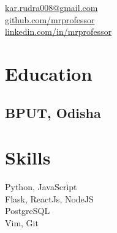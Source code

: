 \documentclass[]{hieudo-build}
\begin{document}
%
%
{
	\faEnvelope \href{mailto:kar.rudra008@gmail.com}{ kar.rudra008@gmail.com}\\
	\faGithub \href{https://github.com/mrprofessor}{   github.com/mrprofessor}\\
	\faLinkedinSquare \href{https://www.linkedin.com/in/mrprofessor}{   linkedin.com/in/mrprofessor}
}
    
%
%
\begin{minipage}[t]{0.34\textwidth} 

\section{Education} 

\subsection{BPUT, Odisha}
\sectionsep


\section{Skills}
Python, JavaScript\\ 

Flask, ReactJs, NodeJS \\

PostgreSQL \\

Vim, Git \\

\sectionsep


\end{minipage}
\end{document}
